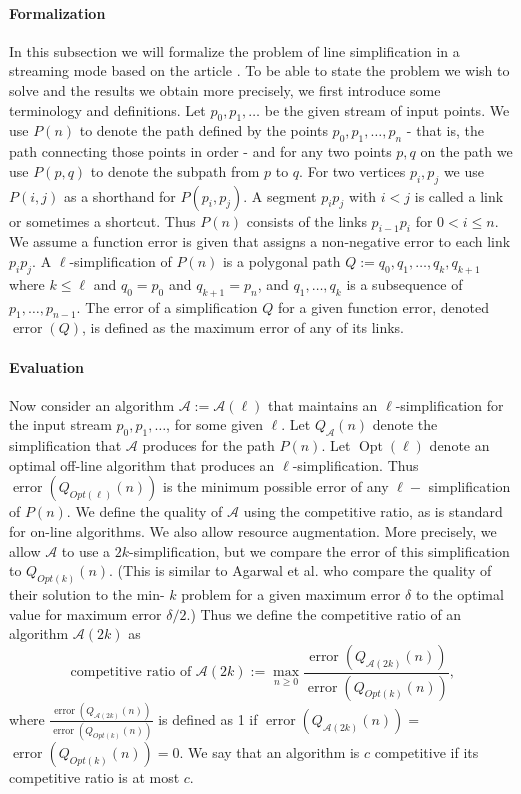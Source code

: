 \paragraph{Formalization}
In this subsection we will formalize the problem of line simplification in a streaming mode based on the article \cite{abam2007streaming}. To be able to state the problem we wish to solve and the results we obtain more precisely, we first introduce some terminology and definitions. Let $p_0, p_1, \ldots$ be the given stream of input points. We use $P(n)$ to denote the path defined by the points $p_0, p_1, \ldots, p_n$ - that is, the path connecting those points in order - and for any two points $p, q$ on the path we use $P(p, q)$ to denote the subpath from $p$ to $q$. For two vertices $p_i, p_j$ we use $P(i, j)$ as a shorthand for $P\left(p_i, p_j\right)$. A segment $p_i p_j$ with $i<j$ is called a link or sometimes a shortcut. Thus $P(n)$ consists of the links $p_{i-1} p_i$ for $0<i \leqslant n$. We assume a function error is given that assigns a non-negative error to each link $p_i p_j$. A $\ell$-simplification of $P(n)$ is a polygonal path $Q:=q_0, q_1, \ldots, q_k, q_{k+1}$ where $k \leqslant \ell$ and $q_0=p_0$ and $q_{k+1}=p_n$, and $q_1, \ldots, q_k$ is a subsequence of $p_1, \ldots, p_{n-1}$. The error of a simplification $Q$ for a given function error, denoted $\operatorname{error}(Q)$, is defined as the maximum error of any of its links.

\paragraph{Evaluation}
Now consider an algorithm $\mathcal{A}:=\mathcal{A}(\ell)$ that maintains an $\ell$-simplification for the input stream $p_0, p_1, \ldots$, for some given $\ell$. Let $Q_{\mathcal{A}}(n)$ denote the simplification that $\mathcal{A}$ produces for the path $P(n)$. Let $\operatorname{Opt}(\ell)$ denote an optimal off-line algorithm that produces an $\ell$-simplification. Thus $\operatorname{error}\left(Q_{O p t(\ell)}(n)\right)$ is the minimum possible error of any $\ell-$ simplification of $P(n)$. We define the quality of $\mathcal{A}$ using the competitive ratio, as is standard for on-line algorithms. We also allow resource augmentation. More precisely, we allow $\mathcal{A}$ to use a $2k$-simplification, but we compare the error of this simplification to $Q_{O p t(k)}(n)$. (This is similar to Agarwal et al. \cite{agarwal2005near} who compare the quality of their solution to the min- $k$ problem for a given maximum error $\delta$ to the optimal value for maximum error $\delta / 2$.) Thus we define the competitive ratio of an algorithm $\mathcal{A}(2 k)$ as 
$$ 
\text { competitive ratio of } \mathcal{A}(2 k):=\max _{n \geqslant 0} \frac{\operatorname{error}\left(Q_{\mathcal{A}(2 k)}(n)\right)}{\operatorname{error}\left(Q_{O p t(k)}(n)\right)}, 
$$
where $\frac{\operatorname{error}\left(Q_{\mathcal{A}(2 k)}(n)\right)}{\operatorname{error}\left(Q_{O p t(k)}(n)\right)}$ is defined as 1 if $\operatorname{error}\left(Q_{\mathcal{A}(2 k)}(n)\right)=$ $\operatorname{error}\left(Q_{O p t(k)}(n)\right)=0$. We say that an algorithm is $c$ competitive if its competitive ratio is at most $c$.

